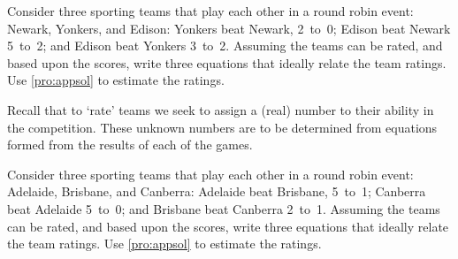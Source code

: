 
\begin{exercise}  
Consider three sporting teams that play each other in a round robin  event: Newark, Yonkers, and Edison:
Yonkers beat Newark, 2~to~0;
Edison beat Newark 5~to~2; and
Edison beat Yonkers 3~to~2.
Assuming the teams can be rated, and  based upon the scores, write three equations that ideally relate the team ratings.  
Use \cref{pro:appsol} to estimate the ratings.

Recall that to `rate' teams we seek to assign a (real) number to their ability in the competition.  These unknown numbers are to be determined from equations formed from the results of each of the games.
\end{exercise}



\begin{reduce}
\begin{exercise}  
Consider three sporting teams that play each other in a round robin  event: Adelaide, Brisbane, and Canberra:
Adelaide beat Brisbane, 5~to~1;
Canberra beat Adelaide 5~to~0; and
Brisbane beat Canberra 2~to~1.
Assuming the teams can be rated, and  based upon the scores, write three equations that ideally relate the team ratings.  
Use \cref{pro:appsol} to estimate the ratings.
\end{exercise}
\end{reduce}



